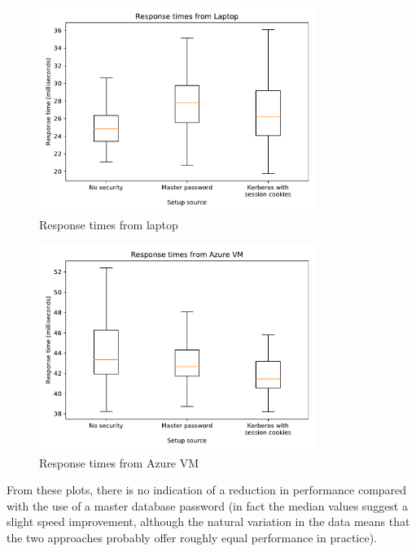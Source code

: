 \documentclass[12pt]{report}
\begin{document}
\begin{figure}[h]
  \begin{center}
    \includegraphics[width=0.8\textwidth]{11-response-times-laptop.pdf}
  \end{center}
  \caption{Response times from laptop}
  \label{fig:response_times_laptop}
\end{figure}

\begin{figure}[h]
  \begin{center}
    \includegraphics[width=0.8\textwidth]{12-response-times-azure.pdf}
  \end{center}
  \caption{Response times from Azure VM}
  \label{fig:response_times_azure}
\end{figure}

From these plots, there is no indication of a reduction in performance compared with the use of a master database password (in fact the median values suggest a slight speed improvement, although the natural variation in the data means that the two approaches probably offer roughly equal performance in practice).
\end{document}
